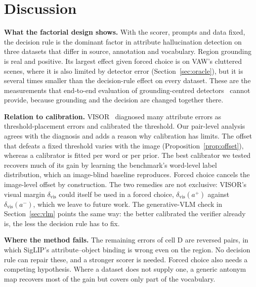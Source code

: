 \documentclass[11pt]{article}
\begin{document}
\section{Discussion}\label{sec:discussion}
\textbf{What the factorial design shows.} With the scorer, prompts and data fixed, the decision rule is the dominant factor in attribute hallucination detection on three datasets that differ in source, annotation and vocabulary. Region grounding is real and positive. Its largest effect given forced choice is on VAW's cluttered scenes, where it is also limited by detector error (Section~\ref{sec:oracle}), but it is several times smaller than the decision-rule effect on every dataset. These are the measurements that end-to-end evaluation of grounding-centred detectors~\cite{guo2026vbackchecker,song2026countervhd} cannot provide, because grounding and the decision are changed together there.

\textbf{Relation to calibration.} VISOR~\cite{zhang2026visor} diagnosed many attribute errors as threshold-placement errors and calibrated the threshold. Our pair-level analysis agrees with the diagnosis and adds a reason why calibration has limits. The offset that defeats a fixed threshold varies with the image (Proposition~\ref{prop:offset}), whereas a calibrator is fitted per word or per prior. The best calibrator we tested recovers much of its gain by learning the benchmark's word-level label distribution, which an image-blind baseline reproduces. Forced choice cancels the image-level offset by construction. The two remedies are not exclusive: VISOR's visual margin $\delta_{\mathrm{vis}}$ could itself be used in a forced choice, $\delta_{\mathrm{vis}}(a^{+})$ against $\delta_{\mathrm{vis}}(a^{-})$, which we leave to future work. The generative-VLM check in Section~\ref{sec:vlm} points the same way: the better calibrated the verifier already is, the less the decision rule has to fix.

\textbf{Where the method fails.} The remaining errors of cell D are reversed pairs, in which SigLIP's attribute--object binding is wrong even on the region. No decision rule can repair these, and a stronger scorer is needed. Forced choice also needs a competing hypothesis. Where a dataset does not supply one, a generic antonym map recovers most of the gain but covers only part of the vocabulary.

\end{document}
